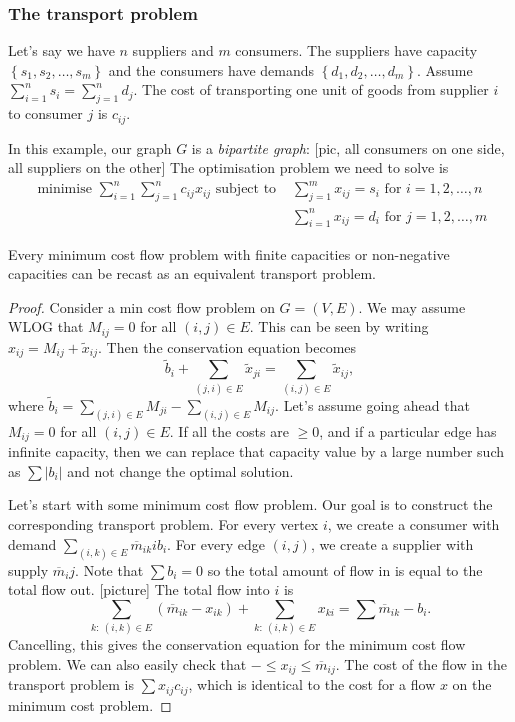 \documentclass[a4paper]{scrartcl}
\begin{document}
\subsubsection{The transport problem}
Let's say we have $n$ suppliers and $m$ consumers. The suppliers have capacity $\left\{s_1 , s_2 , \ldots , s_m\right\}$ and the consumers have demands $\left\{d_1 ,d_2 , \ldots , d_m\right\}$. Assume $\sum_{i=1}^{n}s_i=\sum_{j=1}^{n}d_j$. The cost of transporting one unit of goods from supplier $i$ to consumer $j$ is $c_{ij}$. 

In this example, our graph $G$ is a \emph{bipartite graph}: 
[pic, all consumers on one side, all suppliers on the other]
The optimisation problem we need to solve is
\begin{align*}
	\text{ minimise } \sum_{i=1}^{n} \sum_{j=1}^{n} c_{ij} x_{ij} \text{ subject to }& \sum_{j=1}^{m}x_{ij}=s_i \text{ for } i=1,2, \ldots ,n\\& \sum_{i=1}^{n}x_{ij}=d_i \text{ for } j=1,2,\ldots ,m
\end{align*}
\begin{theorem}
	 Every minimum cost flow problem with finite capacities or non-negative capacities can be recast as an equivalent transport problem. 
\end{theorem}
\begin{proof}
	 Consider a min cost flow problem on $G=(V,E)$. We may assume WLOG that $M_{ij}=0$ for all $(i,j)\in E$. This can be seen by writing $x_{ij}=M_{ij}+\widetilde{x}_{ij}$. Then the conservation equation becomes \[
	 \widetilde{b}_i+\sum_{(j,i) \in E} \widetilde{x}_{ji}=\sum_{(i,j) \in E} \widetilde{x}_{ij}
	 ,\]  where $\widetilde{b}_{i}=\sum_{(j,i) \in E}M_{ji}-\sum_{(i,j) \in E}M_{ij}$. Let's assume going ahead that $M_{ij}=0$ for all $(i,j) \in E$. If all the costs are $\geq 0$, and if a particular edge has infinite capacity, then we can replace that capacity value by a large number such as $\sum |b_{i}|$ and not change the optimal solution.

	 Let's start with some minimum cost flow problem. Our goal is to construct the corresponding transport problem. For every vertex $i$, we create a consumer with demand $\sum_{(i,k)\in E}^{}\overline{m}_{ik} i b_{i}$. For every edge $(i,j)$, we create a supplier with supply $\overline{m}_ij$. Note that $\sum b_{i}=0$ so the total amount of flow in is equal to the total flow out. [picture] The total flow into $i$ is \[
	 \sum_{k: \ (i,k) \in E} (\overline{m}_{ik}-x_{ik})+\sum_{k: \ (i,k) \in E} x_{ki}=\sum \overline{m}_{ik} - b_{i}
	 .\]  
	 Cancelling, this gives the conservation equation for the minimum cost flow problem. We can also easily check that $- \leq x_{ij} \leq \overline{m}_{ij}$. The cost of the flow in the transport problem is $\sum x_{ij}c_{ij}$, which is identical to the cost for a flow $x$ on the minimum cost problem. 
\end{proof}
\end{document}
